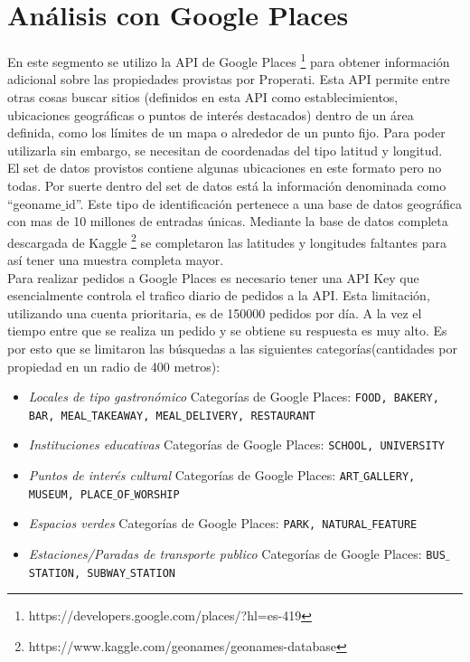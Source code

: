 \documentclass[a4paper, 10pt]{article}
\def\code#1{\texttt{#1}}
\begin{document}
		\part{Análisis con Google Places}
		En este segmento se utilizo la API de Google Places 
		\footnote{https://developers.google.com/places/?hl=es-419} para obtener información adicional 
		sobre las propiedades provistas por Properati. Esta API permite entre otras cosas buscar 
		sitios (definidos en esta API como establecimientos, ubicaciones geográficas o puntos de 
		interés destacados) dentro de un área definida, como los límites de un mapa o alrededor de 
		un punto fijo. Para poder utilizarla sin embargo, se necesitan de coordenadas del tipo 
		latitud y longitud.\\ 
		El set de datos provistos contiene algunas ubicaciones en este formato pero no todas. 
		Por suerte dentro del set de datos está la información denominada como “geoname$\_$id”. 
		Este tipo de identificación pertenece a una base de datos geográfica con mas de 10 
		millones de entradas únicas. 
		Mediante la base de datos completa descargada de Kaggle
		\footnote{https://www.kaggle.com/geonames/geonames-database} se completaron las 
		latitudes y longitudes faltantes para así tener una muestra completa mayor.\\
		Para realizar pedidos a Google Places es necesario tener una API Key que esencialmente 
		controla el trafico diario de pedidos a la API. Esta limitación, utilizando una cuenta 
		prioritaria, es de 150000 pedidos por día. A la vez el tiempo entre que se realiza un 
		pedido y se obtiene su respuesta es muy alto. Es por esto que se limitaron las búsquedas 
		a las siguientes categorías(cantidades por propiedad en un radio de 400 metros):
		
		\begin{itemize}
		\item \emph{Locales de tipo gastronómico}
			\subitem Categorías de Google Places: \code{FOOD, BAKERY, BAR, MEAL$\_$TAKEAWAY, MEAL$\_$DELIVERY, RESTAURANT}
		\item \emph{Instituciones educativas}
			\subitem Categorías de Google Places: \code{SCHOOL, UNIVERSITY}
		\item \emph{Puntos de interés cultural} 
			\subitem Categorías de Google Places: \code{ART$\_$GALLERY, MUSEUM, PLACE$\_$OF$\_$WORSHIP}
		\item \emph{Espacios verdes} 
			\subitem Categorías de Google Places: \code{PARK, NATURAL$\_$FEATURE}
		\item \emph{Estaciones/Paradas de transporte publico}
			\subitem Categorías de Google Places: \code{BUS$\_$STATION, SUBWAY$\_$STATION}			
		\end{itemize}
		
\end{document}
